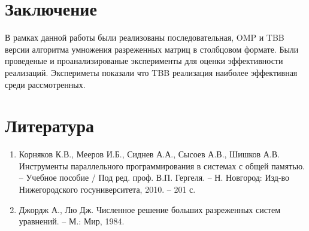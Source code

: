 \documentclass{report}
\begin{document}
\section*{Заключение}
\par В рамках данной работы были реализованы последовательная, OMP и TBB версии алгоритма умножения разреженных матриц в столбцовом формате. Были проведеные и проанализированые эксперименты для оценки эффективности реализаций. Экспериметы показали что TBB реализация наиболее эффективная среди рассмотренных.
\newpage

\section*{Литература}
\begin{enumerate}
	\item Корняков К.В., Мееров И.Б., Сиднев А.А., Сысоев А.В., Шишков А.В.
	Инструменты параллельного программирования в системах с общей
	памятью. – Учебное пособие / Под ред. проф. В.П. Гергеля. – Н. Новгород: Изд-во Нижегородского госуниверситета, 2010. – 201 с.
	\item Джордж А., Лю Дж. Численное решение больших разреженных систем уравнений. – М.: Мир, 1984.
\end{enumerate}
\newpage
\end{document}
